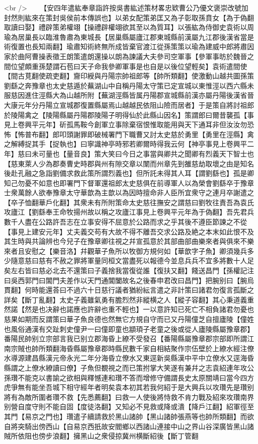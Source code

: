 <br />
　　【安四年遣紘奉章詣許按吳書紘述策材畧忠欵曹公乃優文褒崇改號加封然則紘來在策封吳侯前本傳誤也】以弟女配策弟匡又為子彰取孫賁女【為于偽翻取讀曰娶】禮辟策弟權翊【操禮辟權翊欲其至以為質耳】以張紘為侍御史袁術以周瑜為居巢長以臨淮魯肅為東城長【居巢縣屬廬江郡東城縣前漢屬九江郡後漢省當是術復置也長知兩翻】瑜肅知術終無所成皆棄官渡江從孫策策以瑜為建威中郎將肅因家於曲阿曹操表徵王朗策遣朗還操以朗為諫議大夫參司空軍事【參軍事昉於魏晉之間位望頗重孫楚謂石苞曰天子命我參卿軍事是也自是以後位望輕矣】袁術遣間使【間古莧翻使疏吏翻】齎印綬與丹陽宗帥祖郎等【帥所類翻】使激動山越共圖孫策劉繇之奔豫章也太史慈遁於蕪湖山中自稱丹陽太守策已定宣城以東惟涇以西六縣未服慈因進住涇縣大為山越所附【蕪湖涇縣皆属丹陽郡宣城縣前漢亦屬丹陽後漢省晉大康元年分丹陽立宣城郡復置縣屬焉山越越民依阻山險而居者】于是策自將討祖郎於陵陽禽之【陵陽縣屬丹陽郡陵陽子明得仙於此縣山因名】策謂郎曰爾昔襲孤【事見上卷興平元年】斫孤馬鞍今創軍立事除棄宿恨惟取能用與天下通耳非但汝汝勿恐怖【怖普布翻】郎叩頭謝罪即破械署門下職曹又討太史慈於勇里【勇里在涇縣】禽之解縛捉其手【捉執也】曰寧識神亭時邪若卿爾時得我云何【神亭事見上卷興平二年】慈曰未可量也【量音良】策大笑曰今日之事當與卿共之聞卿有烈義天下智士也【慈東萊人少為郡奏曹史時郡與州有隙交章以闈而州章先到雒慈劫取壞之由是知名後赴孔融之急詣劉備求救此策所謂烈義也】但所託未得其人耳【謂劉繇也】孤是卿知己勿憂不如意也即署門下督軍還祖郎太史慈俱在前導軍人以為榮會劉繇卒于豫章士衆萬餘人欲奉豫章太守華歆為主歆以為因時擅命非人臣所宜衆守之連月卒謝遣之【卒子恤翻華戶化翻】其衆未有所附策命太史慈往撫安之謂慈曰劉牧往責吾為袁氏攻廬江【劉繇奉王命牧揚州故以稱之攻廬江事見上卷興平元年為于偽翻】吾先君兵數千人盡在公路許吾志在立事安得不屈意於公路而求之乎其後不遵臣節諫之不從【事見上建安元年】丈夫義交苟有大故不得不離吾交求公路及絶之本末如此恨不及其生時與共論辨也今兒子在豫章卿往視之幷宣孤意於其部曲部曲樂來者與俱來不樂來者且安慰之【樂音洛】幷觀華子魚所以牧御方規何如【華歆字子魚】卿須幾兵多少隨意慈曰慈有不赦之罪將軍量同桓文當盡死以報德今並息兵兵不宜多將數十人足矣左右皆曰慈必北去不還策曰子義捨我當復從誰【復扶又翻】餞送昌門【孫權記注曰吳西郭門曰閶門夫差作以天門通閶闔故名之後春申君改曰昌門】把腕别曰【腕烏貫翻】何時能還荅曰不過六十日慈行議者猶紛紜言遣之非計策曰諸君勿復言孤斷之詳矣【斷丁亂翻】太史子義雖氣勇有膽烈然非縱横之人【縱子容翻】其心秉道義重然諾【然是也决辭也諾應也許辭也重不輕也】一以意許知已死亡不相負諸君勿憂也慈果如期而反謂策曰華子魚良德也然無它方規自守而已又丹陽僮芝自擅廬陵【僮姓也風俗通漢有交趾刺史僮尹一曰僮即童也顓頊子老童之後或從人廬陵縣屬豫章郡】番陽民帥别立宗部言我已别立郡海昏上繚不受發召【番陽縣屬豫章郡宗部即所謂江南宗賊也帥所類翻海昏縣屬豫章郡時縣民數千家自相結聚作宗伍壁於上繚水經注僚水導源建昌縣漢元帝永光二年分海昏立僚水又東逕新吳縣漢中平中立僚水又逕海昏縣謂之上僚水繚讀曰僚】子魚但覩視之而已策拊掌大笑遂有兼幷之志袁紹連年攻公孫瓚不能克以書諭之欲相與釋憾連和瓚不答而增修守備謂長史太原關靖曰當今四方虎爭無有能坐吾城下相守經年者明矣袁本初其若我何紹于是大興兵以攻瓚先是瓚别將有為敵所圍者瓚不救【先悉薦翻】曰救一人使後將恃救不肯力戰及紹來攻瓚南界别營自度守則不能自固【度徒洛翻】又知必不見救或降或潰【降戶江翻】紹軍徑至其門【易京之門也】瓚遣子續請救於黑山諸帥【黑山諸帥張燕等也帥所類翻】而欲自將突騎出傍西山【自易京西扺故安閻鄉以西諸山連接中山之界山谷深廣皆黑山諸賊所依阻也傍步浪翻】擁黑山之衆侵掠冀州横斷紹後【斷丁管翻